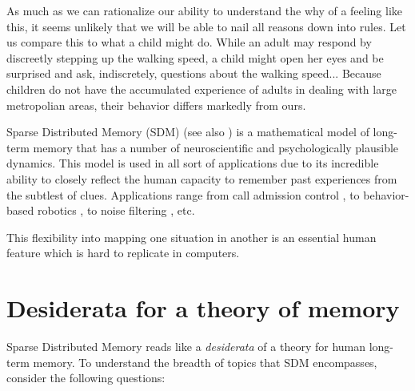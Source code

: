 As much as we can rationalize our ability to understand the why of a feeling like this, it seems unlikely that we will be able to nail all reasons down into rules.  Let us compare this to what a child might do.  While an adult may respond by discreetly stepping up the walking speed, a child might open her eyes and be surprised and ask, indiscretely, questions about the walking speed... Because children do not have the accumulated experience of adults in dealing with large metropolian areas, their behavior differs markedly from ours.

Sparse Distributed Memory (SDM) \citep{Kanerva1988} (see also \citep{denning_sparse_1989,  flynn_sparse_1989, kanerva_sparse_1993, kanerva_parallel_1985, goos_binary_1996, kanerva_hyperdimensional_2009,  keeler_comparison_1988, rwcp_fully_1997, marinaro_spatter_1994, sahlgren_permutations_nodate, uesaka_foundations_2001}) is a mathematical model of long-term memory that has a number of neuroscientific and psychologically plausible dynamics. This model is used in all sort of applications due to its incredible ability to closely reflect the human capacity to remember past experiences from the subtlest of clues. Applications range from call admission control \citep{kwon_atm_1998, hee-yong_kwon_atm_1997}, to behavior-based robotics \citep{Rajesh1998, mendes2008robot, jockel_sparse_2009}, to noise filtering \citep{meng_modified_2009}, etc.

This flexibility into mapping one situation in another is an essential human feature which is hard to replicate in computers.

\section{Desiderata for a theory of memory}


Sparse Distributed Memory reads like a \emph{desiderata} of a theory for human long-term memory.  To understand the breadth of topics that SDM encompasses, consider the following questions:

